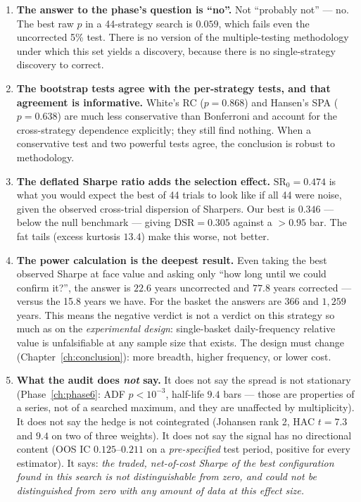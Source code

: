 \begin{enumerate}[label=\textbf{A\arabic*.}]
  \item \textbf{The answer to the phase's question is ``no''.} Not ``probably not'' --- no.
    The best raw $p$ in a 44-strategy search is $0.059$, which fails even the uncorrected
    5\% test. There is no version of the multiple-testing methodology under which this set
    yields a discovery, because there is no single-strategy discovery to correct.
  \item \textbf{The bootstrap tests agree with the per-strategy tests, and that agreement
    is informative.} White's RC ($p=0.868$) and Hansen's SPA ($p=0.638$) are much less
    conservative than Bonferroni and account for the cross-strategy dependence explicitly;
    they still find nothing. When a conservative test and two powerful tests agree, the
    conclusion is robust to methodology.
  \item \textbf{The deflated Sharpe ratio adds the selection effect.}
    $\mathrm{SR}_0=0.474$ is what you would expect the best of 44 trials to look like if
    all 44 were noise, given the observed cross-trial dispersion of Sharpers. Our best is
    $0.346$ --- below the null benchmark --- giving $\mathrm{DSR}=0.305$ against a $>0.95$
    bar. The fat tails (excess kurtosis $13.4$) make this worse, not better.
  \item \textbf{The power calculation is the deepest result.} Even taking the best observed
    Sharpe at face value and asking only ``how long until we could confirm it?'', the
    answer is $22.6$ years uncorrected and $77.8$ years corrected --- versus the 15.8 years
    we have. For the  basket the answers are $366$ and $1{,}259$ years. This
    means the negative verdict is not a verdict on this strategy so much as on the
    \emph{experimental design}: single-basket daily-frequency relative value is
    unfalsifiable at any sample size that exists. The design must change
    (Chapter~\ref{ch:conclusion}): more breadth, higher frequency, or lower cost.
  \item \textbf{What the audit does \emph{not} say.} It does not say the spread is not
    stationary (Phase~\ref{ch:phase6}: ADF $p<10^{-3}$, half-life $9.4$ bars --- those are
    properties of a series, not of a searched maximum, and they are unaffected by
    multiplicity). It does not say the hedge is not cointegrated (Johansen rank 2, HAC
    $t=7.3$ and $9.4$ on two of three weights). It does not say the signal has no
    directional content (OOS IC $0.125$--$0.211$ on a \emph{pre-specified} test period,
    positive for every estimator). It says: \emph{the traded, net-of-cost Sharpe of the
    best configuration found in this search is not distinguishable from zero, and could not
    be distinguished from zero with any amount of data at this effect size.}
\end{enumerate}

